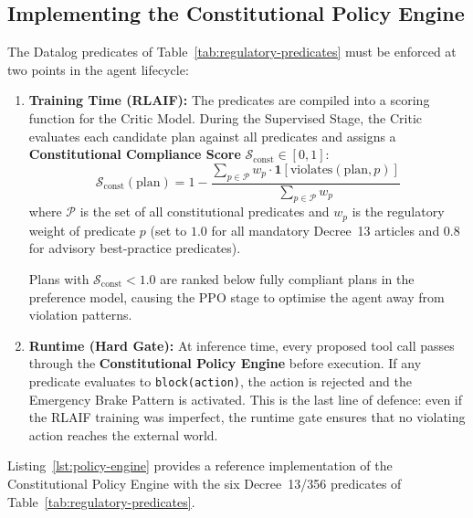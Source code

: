 \subsection{Implementing the Constitutional Policy Engine}
\label{subsec:policy-engine}

The Datalog predicates of Table~\ref{tab:regulatory-predicates}
must be enforced at two points in the agent lifecycle:

\begin{enumerate}
  \item \textbf{Training Time (RLAIF):}
    The predicates are compiled into a scoring function for the
    Critic Model.
    During the Supervised Stage, the Critic evaluates each
    candidate plan against all predicates and assigns a
    \textbf{Constitutional Compliance Score}
    $\mathcal{S}_{\mathrm{const}} \in [0, 1]$:
    \begin{equation}
      \label{eq:compliance-score}
      \mathcal{S}_{\mathrm{const}}(\mathrm{plan})
        = 1 - \frac{
            \sum_{p \in \mathcal{P}}
              w_p \cdot \mathbf{1}[\mathrm{violates}(
                \mathrm{plan}, p)]
          }{
            \sum_{p \in \mathcal{P}} w_p
          }
    \end{equation}
    where $\mathcal{P}$ is the set of all constitutional
    predicates and $w_p$ is the regulatory weight of
    predicate $p$ (set to $1.0$ for all mandatory Decree~13
    articles and $0.8$ for advisory best-practice predicates).

    Plans with $\mathcal{S}_{\mathrm{const}} < 1.0$ are ranked
    below fully compliant plans in the preference model,
    causing the PPO stage to optimise the agent away from
    violation patterns.

  \item \textbf{Runtime (Hard Gate):}
    At inference time, every proposed tool call passes through
    the \textbf{Constitutional Policy Engine} before execution.
    If any predicate evaluates to \texttt{block(action)}, the
    action is rejected and the Emergency Brake Pattern is
    activated.
    This is the last line of defence: even if the RLAIF training
    was imperfect, the runtime gate ensures that no violating
    action reaches the external world.
\end{enumerate}

Listing~\ref{lst:policy-engine} provides a reference
implementation of the Constitutional Policy Engine with the
six Decree~13/356 predicates of
Table~\ref{tab:regulatory-predicates}.

